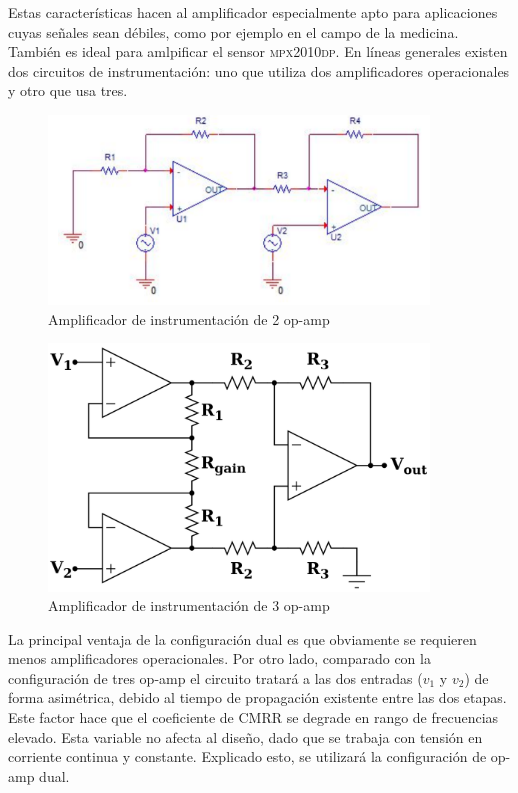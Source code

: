 Estas caracter\'isticas hacen al amplificador especialmente apto para aplicaciones cuyas se\~nales sean d\'ebiles, como por ejemplo en el campo de la medicina. Tambi\'en es ideal para amlpificar el sensor \textsc{mpx2010dp}. En l\'ineas generales existen dos circuitos de instrumentaci\'on: uno que utiliza dos amplificadores operacionales y otro que usa tres.

\begin{figure}[H]
    \centering
    \includegraphics[width=0.9\textwidth]{../EJ4/resources/instrumental_2opamp.png}
    \caption{Amplificador de instrumentaci\'on de 2 op-amp}
    \label{fig:EJ4_instrumental_2opamp}
\end{figure}

\begin{figure}[H]
    \centering
    \includegraphics[width=0.9\textwidth]{../EJ4/resources/instrumental_3opamp.png}
    \caption{Amplificador de instrumentaci\'on de 3 op-amp}
    \label{fig:EJ4_instrumental_3opamp}
\end{figure}
 
 La principal ventaja de la configuraci\'on dual es que obviamente se requieren menos amplificadores operacionales. Por otro lado, comparado con la configuraci\'on de tres op-amp el circuito tratar\'a a las dos entradas ($v_1$ y $v_2$) de forma asim\'etrica, debido al tiempo de propagaci\'on existente entre las dos etapas. Este factor hace que el coeficiente de CMRR se degrade en rango de frecuencias elevado. Esta variable no afecta al diseño, dado que se trabaja con tensi\'on en corriente continua y constante. Explicado esto, se utilizar\'a la configuraci\'on de op-amp dual.
 
